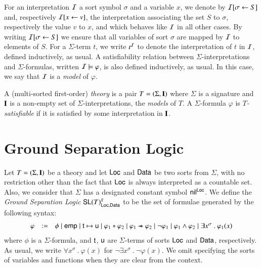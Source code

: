 \documentclass{llncs}
\begin{document}
For an interpretation $\mathcal{I}$ a sort symbol $\sigma$ and a variable $x$,
we denote by $\mathcal{I}[\sigma \leftarrow S]$ and, respectively $\mathcal{I}[x
  \leftarrow v]$, the interpretation associating the set $S$ to
$\sigma$, respectively the value $v$ to $x$, and which behaves like
$\mathcal{I}$ in all other cases. By writing $\mathcal{I}[\sigma \leftarrow S]$ we
ensure that all variables of sort $\sigma$ are mapped by $\mathcal{I}$ to
elements of $S$. For a $\Sigma$-term $t$, we write $t^{\mathcal{I}}$ to denote
the interpretation of $t$ in $\mathcal{I}$, defined inductively, as usual. A
satisfiability relation between $\Sigma$-interpretations and
$\Sigma$-formulas, written $\mathcal{I} \models \varphi$, is also defined
inductively, as usual. In this case, we say that $\mathcal{I}$ is a
\emph{model} of $\varphi$. 

A (multi-sorted first-order) \emph{theory} is a pair \(T = (\Sigma,
\mathbf{I})\) where $\Sigma$ is a signature and $\mathbf{I}$ is a non-empty set
of $\Sigma$-interpretations, the \emph{models} of $T$. A
$\Sigma$-formula $\varphi$ is \emph{$T$-satisfiable} if it is
satisfied by some interpretation in $\mathbf{I}$.

\section{Ground Separation Logic}

Let \(T = (\Sigma, \mathbf{I})\) be a theory and let $\mathsf{Loc}$ and $\mathsf{Data}$ be
two sorts from $\Sigma$, with no restriction other than the fact that
$\mathsf{Loc}$ is always interpreted as a countable set. Also, we consider
that $\Sigma$ has a designated constant symbol $\mathsf{nil}^{\mathsf{Loc}}$. We define
the \emph{Ground Separation Logic} $\mathsf{SL}(T)^g_{\mathsf{Loc},\mathsf{Data}}$ to
be the set of formulae generated by the following syntax:
\[\begin{array}{lcl}
\varphi & := & \phi \mid \mathsf{emp} \mid \mathsf{t} \mapsto \mathsf{u} \mid
\varphi_1 * \varphi_2 \mid \varphi_1 \mathrel{\mbox{$\hspace*{-0.03em}\mathord{-}\hspace*{-0.66em} \mathord{-}\hspace*{-0.36em}\mathord{*}$\hspace*{-0.005em}}} \varphi_2 \mid \neg
\varphi_1 \mid \varphi_1 \wedge \varphi_2 \mid \exists x^\sigma ~.~
\varphi_1(x)
\end{array}\]
where $\phi$ is a $\Sigma$-formula, and $\mathsf{t}$, $\mathsf{u}$ are
$\Sigma$-terms of sorts $\mathsf{Loc}$ and $\mathsf{Data}$, respectively. As usual,
we write $\forall x^\sigma ~.~ \varphi(x)$ for $\neg\exists x^\sigma
~.~ \neg\varphi(x)$. We omit specifying the sorts of variables and
functions when they are clear from the context.
\end{document}
